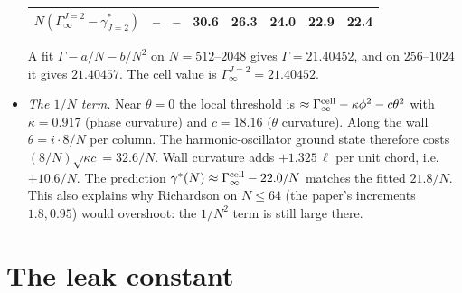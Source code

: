 \documentclass[11pt]{article}
\theoremstyle{definition}
\theoremstyle{remark}
\begin{document}
\begin{itemize}
\begin{center}
\begin{tabular}{r|ccccccc}
$N(\Gamma^{J=2}_\infty-\gamma^\ast_{J=2})$ & -- & -- & 30.6 & 26.3 & 24.0 & 22.9 & 22.4\\
\bottomrule
\end{tabular}
\end{center}
A fit $\Gamma-a/N-b/N^2$ on $N=512$--$2048$ gives $\Gamma=21.40452$, and on $256$--$1024$ it gives $21.40457$. The cell value is $\Gamma^{J=2}_\infty=21.40452$.
\item \emph{The $1/N$ term.} Near $\theta=0$ the local threshold is $\approx\Gamma^{\rm cell}_\infty-\kappa\phi^2-c\theta^2$ with $\kappa=0.917$ (phase curvature) and $c=18.16$ ($\theta$ curvature). Along the wall $\theta=i\cdot8/N$ per column. The harmonic-oscillator ground state therefore costs $(8/N)\sqrt{\kappa c}=32.6/N$. Wall curvature adds $+1.325\,\ell$ per unit chord, i.e.\ $+10.6/N$. The prediction $\gamma^\ast(N)\approx\Gamma^{\rm cell}_\infty-22.0/N$ matches the fitted $21.8/N$. This also explains why Richardson on $N\le64$ (the paper's increments $1.8,0.95$) would overshoot: the $1/N^2$ term is still large there.
\end{itemize}

\section{The leak constant}\label{sec:leak}
\end{document}
